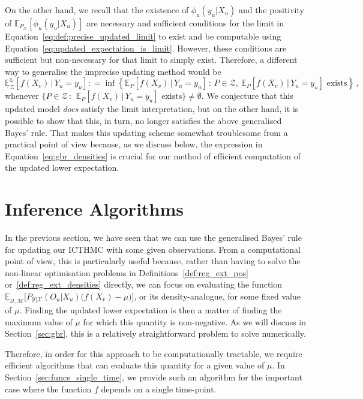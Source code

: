 \documentclass[twoside,11pt]{article}
\newcommand{\states}{\mathcal{X}}
\newcommand{\observs}{\mathcal{Y}}
\newcommand{\lexp}{\underline{\mathbb{E}}_{\rateset,\mathcal{M}}}
\newcommand{\rateset}{\mathcal{Q}}
\newcommand{\coloneqq}{:\!=}
\begin{document}
On the other hand, we recall that the existence of $\phi_u(y_u\vert X_u)$ and the positivity of $\mathbb{E}_{P_\states}[\phi_u(y_u\vert X_u)]$ are necessary and sufficient conditions for the limit in Equation~\eqref{eq:def:precise_updated_limit} to exist and be computable using Equation~\eqref{eq:updated_expectation_is_limit}. However, these conditions are sufficient but non-necessary for that limit to simply exist. Therefore, a different way to generalise the imprecise updating method would be
\begin{equation*}
\underline{\mathbb{E}}_\mathcal{Z}^\mathrm{L}[f(X_v)\,\vert\,Y_u=y_u] \coloneqq \inf\left\{ \mathbb{E}_P[f(X_v)\,\vert\,Y_u=y_u]\,:\, P\in\mathcal{Z},~\text{$\mathbb{E}_P[f(X_v)\,\vert\,Y_u=y_u]$ exists} \right\}\,,
\end{equation*}
whenever $\{P\in\mathcal{Z}\,:\,~\text{$\mathbb{E}_P[f(X_v)\,\vert\,Y_u=y_u]$ exists}\}\neq\emptyset$. We conjecture that this updated model \emph{does} satisfy the limit interpretation, but on the other hand, it is possible to show that this, in turn, no longer satisfies the above generalised Bayes' rule. That makes this updating scheme somewhat troublesome from a practical point of view because, as we discuss below, the expression in Equation~\eqref{eq:gbr_densities} is crucial for our method of efficient computation of the updated lower expectation.


\section{Inference Algorithms}\label{sec:inference_algos}

In the previous section, we have seen that we can use the generalised Bayes' rule for updating our ICTHMC with some given observations. From a computational point of view, this is particularly useful because, rather than having to solve the non-linear optimisation problems 
in Definitions~\ref{def:reg_ext_pos} or~\ref{def:reg_ext_densities} directly, 
we can focus on evaluating the function $\lexp\bigl[P_{\observs\vert\states}(O_u\vert X_u)\bigl(f(X_v) - \mu\bigr)\bigr]$,
or its density-analogue, for some fixed value of $\mu$. Finding the updated lower expectation is then a matter of finding the maximum value of $\mu$ for which this quantity is non-negative. As we will discuss in Section~\ref{sec:gbr}, this is a relatively straightforward problem to solve numerically.

Therefore, in order for this approach to be computationally tractable, we require efficient algorithms that can evaluate this quantity for a given value of $\mu$. In Section~\ref{sec:funcs_single_time}, we provide such an algorithm for the important case where the function $f$ depends on a single time-point.
\end{document}
